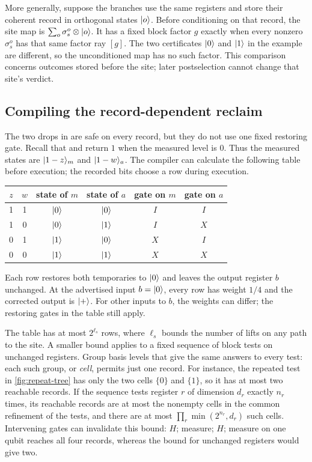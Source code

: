 \documentclass[acmsmall,screen,review,anonymous,nonacm]{acmart}
\begin{document}
More generally, suppose the branches use the same registers and store
their coherent record in orthogonal states $\lvert o \rangle$. Before conditioning
on that record, the site map is
$\sum_o\sigma_s^o\otimes\lvert o \rangle$.
It has a fixed block factor $g$ exactly when every nonzero
$\sigma_s^o$ has that same factor ray $[g]$.
The two certificates $\lvert 0 \rangle$ and $\lvert 1 \rangle$ in the example are different,
so the unconditioned map has no such factor. This comparison concerns
outcomes stored before the site; later postselection cannot change that
site's verdict.

\subsection{Compiling the record-dependent reclaim}\label{sec:residual}

The two drops in  are safe on every record, but they
do not use one fixed restoring gate. Recall that
 and  return $1$
when the measured level is $0$. Thus the measured states are
$\lvert 1-z \rangle_m$ and $\lvert 1-w \rangle_a$. The compiler can calculate the following
table before execution; the recorded bits choose a row during execution.
\begin{center}
\begin{tabular}{cc@{\qquad}cc@{\qquad}cc}
\toprule
$z$ & $w$ & state of $m$ & state of $a$ & gate on $m$ & gate on $a$\\
\midrule
1 & 1 & $\lvert 0 \rangle$ & $\lvert 0 \rangle$ & $I$ & $I$\\
1 & 0 & $\lvert 0 \rangle$ & $\lvert 1 \rangle$ & $I$ & $X$\\
0 & 1 & $\lvert 1 \rangle$ & $\lvert 0 \rangle$ & $X$ & $I$\\
0 & 0 & $\lvert 1 \rangle$ & $\lvert 1 \rangle$ & $X$ & $X$\\
\bottomrule
\end{tabular}
\end{center}
Each row restores both temporaries to $\lvert 0 \rangle$ and leaves the output
register $b$ unchanged. At the advertised input $b=\lvert 0 \rangle$, every row
has weight $1/4$ and the corrected output is $\lvert + \rangle$. For other inputs
to $b$, the weights can differ; the restoring gates in the table still apply.

\stmtReuseRecord

The table has at most $2^{\ell_s}$ rows, where $\ell_s$ bounds the number
of lifts on any path to the site. A smaller bound applies to a fixed
sequence of block tests on unchanged registers. Group basis levels that
give the same answers to every test: each such group, or \emph{cell},
permits just one record. For instance, the repeated test in
\cref{fig:repeat-tree} has only the two cells $\{0\}$ and $\{1\}$,
so it has at most two reachable records. If the sequence tests register $r$
of dimension $d_r$ exactly $n_r$ times, its reachable records are at most the nonempty cells
in the common refinement of the tests, and there are at most
$\prod_r\min(2^{n_r},d_r)$ such cells. Intervening gates can invalidate
this bound: $H$; measure; $H$; measure on one qubit reaches all four
records, whereas the bound for unchanged registers would give two.
\end{document}
